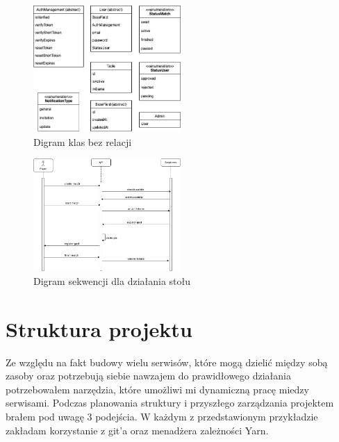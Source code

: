 \begin{figure}[h!]
  \centering
    \includegraphics[width=0.5\textwidth]{images/diagrams/class_diagram_rest.png}
  \caption{Digram klas bez relacji}
  \label{fig:mobile}
\end{figure}

\begin{figure}[h!]
  \centering
    \includegraphics[width=0.5\textwidth]{images/diagrams/match_event_flow.png}
  \caption{Digram sekwencji dla działania stołu}
  \label{fig:mobile}
\end{figure}

\begin{center}
  \end{center}

\section{Struktura projektu}
Ze względu na fakt budowy wielu serwisów, które mogą dzielić między sobą zasoby oraz potrzebują siebie nawzajem do prawidłowego działania potrzebowałem narzędzia, które umożliwi mi dynamiczną pracę miedzy serwisami. Podczas planowania struktury i przyszłego zarządzania projektem brałem pod uwagę 3 podejścia. W każdym z przedstawionym przykładzie zakładam korzystanie z git'a oraz menadżera zależności Yarn.

